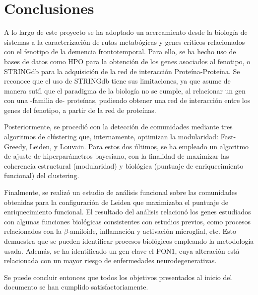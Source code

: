 \section{Conclusiones}

A lo largo de este proyecto se ha adoptado un acercamiento desde la biología de sistemas a la caracterización de rutas metabógicas y genes críticos relacionados con el fenotipo de la demencia frontotemporal. Para ello, se ha hecho uso de bases de datos como HPO para la obtención de los genes asociados al fenotipo, o STRINGdb para la adquisición de la red de interacción Proteína-Proteína. Se reconoce que el uso de STRINGdb tiene sus limitaciones, ya que asume de manera sutíl que el paradigma de la biología no se cumple, al relacionar un gen con una -familia de- proteínas, pudiendo obtener una red de interacción entre los genes del fenotipo, a partir de la red de proteínas. 

Posteriormente, se procedió con la detección de comunidades mediante tres algoritmos de clústering que, internamente, optimizan la modularidad: Fast-Greedy, Leiden, y Louvain. Para estos dos últimos, se ha empleado un algoritmo de ajuste de hiperparámetros bayesiano, con la finalidad de maximizar las coherencia estructural (modularidad) y biológica (puntuaje de enriquecimiento funcional) del clustering. 

Finalmente, se realizó un estudio de análisis funcional sobre las comunidades obtenidas para la configuración de Leiden que maximizaba el puntuaje de enriquecimiento funcional. El resultado del análisis relacionó los genes estudiados con algunas funciones biológicas consistentes con estudios previos, como procesos relacionados con la $\beta$-amiloide, inflamación y activación microglial, etc. Esto demuestra que se pueden identificar procesos biológicos empleando la metodología usada. Además, se ha identificado un gen clave el PON1, cuya alteración está relacionada con un mayor riesgo de enfermedades neurodegenerativas. 

Se puede concluir entonces que todos los objetivos presentados al inicio del documento se han cumplido satisfactoriamente.